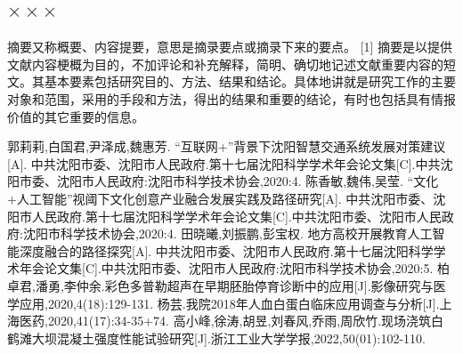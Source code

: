 \documentclass[12pt,oneside,a4paper,fleqn]{ctexart}
\begin{document}
\begin{spacing}{1.25}
\end{spacing}\vspace{0.5em} \subsection{\heiti $\times \times \times $}\begin{spacing}{1.25}

摘要又称概要、内容提要，意思是摘录要点或摘录下来的要点。 [1]  摘要是以提供文献内容梗概为目的，不加评论和补充解释，简明、确切地记述文献重要内容的短文。其基本要素包括研究目的、方法、结果和结论。具体地讲就是研究工作的主要对象和范围，采用的手段和方法，得出的结果和重要的结论，有时也包括具有情报价值的其它重要的信息。

\end{spacing}\vspace{0.5em} 
\begin{thebibliography}{99}
    \vspace{0.5em}
    \begin{spacing}{1.25}
      

    郭莉莉,白国君,尹泽成,魏惠芳. “互联网+”背景下沈阳智慧交通系统发展对策建议[A]. 中共沈阳市委、沈阳市人民政府.第十七届沈阳科学学术年会论文集[C].中共沈阳市委、沈阳市人民政府:沈阳市科学技术协会,2020:4.
    陈香敏,魏伟,吴莹. “文化+人工智能”视阈下文化创意产业融合发展实践及路径研究[A]. 中共沈阳市委、沈阳市人民政府.第十七届沈阳科学学术年会论文集[C].中共沈阳市委、沈阳市人民政府:沈阳市科学技术协会,2020:4.
    田晓曦,刘振鹏,彭宝权. 地方高校开展教育人工智能深度融合的路径探究[A]. 中共沈阳市委、沈阳市人民政府.第十七届沈阳科学学术年会论文集[C].中共沈阳市委、沈阳市人民政府:沈阳市科学技术协会,2020:5.
    柏卓君,潘勇,李仲余.彩色多普勒超声在早期胚胎停育诊断中的应用[J].影像研究与医学应用,2020,4(18):129-131.
    杨芸.我院2018年人血白蛋白临床应用调查与分析[J].上海医药,2020,41(17):34-35+74.
    高小峰,徐涛,胡昱,刘春风,乔雨,周欣竹.现场浇筑白鹤滩大坝混凝土强度性能试验研究[J].浙江工业大学学报,2022,50(01):102-110.
    \end{spacing}
\end{thebibliography}
\end{document}
